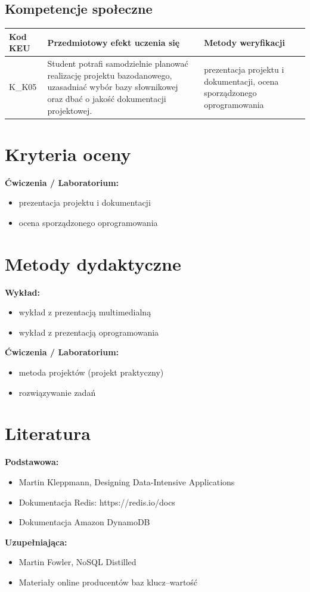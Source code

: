 \documentclass[12pt, a4paper]{article}
\begin{document}
\subsection*{Kompetencje społeczne}
\begin{longtable}{|p{1.6cm}|p{9.0cm}|p{4.2cm}|}
\hline
\rowcolor{tableHeader}
\textbf{Kod KEU} & \textbf{Przedmiotowy efekt uczenia się} & \textbf{Metody weryfikacji} \\
\endhead
  \hline
  K\_K05 & Student potrafi samodzielnie planować realizację projektu bazodanowego, uzasadniać wybór bazy słownikowej oraz dbać o jakość dokumentacji projektowej. & prezentacja projektu i dokumentacji, ocena sporządzonego oprogramowania \\
  \hline
\end{longtable}

\section{Kryteria oceny}

\textbf{Ćwiczenia / Laboratorium:}
\begin{itemize}
  \item prezentacja projektu i dokumentacji
  \item ocena sporządzonego oprogramowania
\end{itemize}


\section{Metody dydaktyczne}

\textbf{Wykład:}
\begin{itemize}
  \item wykład z prezentacją multimedialną
  \item wykład z prezentacją oprogramowania
\end{itemize}
\vspace{4pt}
\textbf{Ćwiczenia / Laboratorium:}
\begin{itemize}
  \item metoda projektów (projekt praktyczny)
  \item rozwiązywanie zadań
\end{itemize}
\vspace{4pt}


\section{Literatura}

\textbf{Podstawowa:}
\begin{itemize}
  \item Martin Kleppmann, Designing Data-Intensive Applications
  \item Dokumentacja Redis: https://redis.io/docs
  \item Dokumentacja Amazon DynamoDB
\end{itemize}

\textbf{Uzupełniająca:}
\begin{itemize}
  \item Martin Fowler, NoSQL Distilled
  \item Materiały online producentów baz klucz–wartość
\end{itemize}
\end{document}
